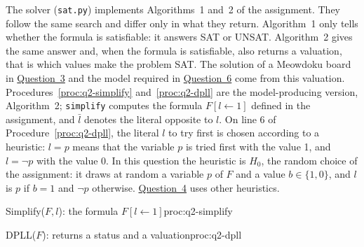 The solver (\texttt{sat.py}) implements Algorithms~1 and~2 of the assignment. They follow the same search and differ only in what they return. Algorithm~1 only tells whether the formula is satisfiable: it answers SAT or UNSAT. Algorithm~2 gives the same answer and, when the formula is satisfiable, also returns a valuation, that is which values make the problem SAT. The solution of a Meowdoku board in \hyperref[sec:q3]{Question~3} and the model required in \hyperref[sec:q6]{Question~6} come from this valuation. Procedures~\ref{proc:q2-simplify} and~\ref{proc:q2-dpll} are the model-producing version, Algorithm~2; \texttt{simplify} computes the formula $F[l\leftarrow1]$ defined in the assignment, and $\bar l$ denotes the literal opposite to $l$. On line 6 of Procedure~\ref{proc:q2-dpll}, the literal $l$ to try first is chosen according to a heuristic: $l=p$ means that the variable $p$ is tried first with the value 1, and $l=\neg p$ with the value 0. In this question the heuristic is $H_0$, the random choice of the assignment: it draws at random a variable $p$ of $F$ and a value $b\in\{1,0\}$, and $l$ is $p$ if $b=1$ and $\neg p$ otherwise. \hyperref[sec:q4]{Question~4} uses other heuristics.

\begin{pseudo}{Simplify($F,l$): the formula $F[l\leftarrow1]$}{proc:q2-simplify}
\end{pseudo}

\begin{pseudo}{DPLL($F$): returns a status and a valuation}{proc:q2-dpll}
\end{pseudo}

